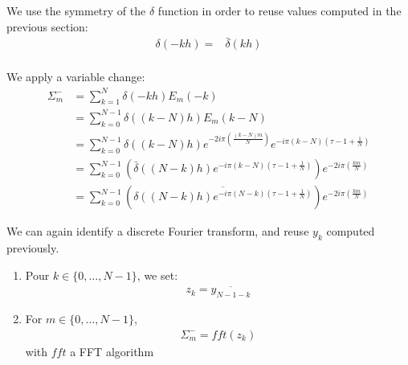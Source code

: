 We use the symmetry of the $\delta$ function in order to reuse values computed in the previous section:
\begin{align*}
\delta(-kh)=&\bar{\delta}(kh)\\
\end{align*}

We apply a variable change:
\begin{align*}
\Sigma_{m}^{-}&=\sum_{k=1}^{N}\delta(-kh)E_{m}(-k)\\
  &=\sum_{k=0}^{N-1}\delta((k-N)h)E_{m}(k-N)\\
  &=\sum_{k=0}^{N-1}\delta((k-N)h) e^{-2i\pi\left(\frac{(k-N) m}{N}\right)}e^{-i\pi (k-N)\left(\tau-1+\frac{1}{N}\right)}\\
  &=\sum_{k=0}^{N-1}\left(\bar{\delta}((N-k)h) e^{-i\pi (k-N)\left(\tau-1+\frac{1}{N}\right)}\right) e^{-2i\pi\left(\frac{k m}{N}\right)} \\
  &=\sum_{k=0}^{N-1}\left(\overline{\delta((N-k)h) e^{-i\pi (N-k)\left(\tau-1+\frac{1}{N}\right)}}\right) e^{-2i\pi\left(\frac{k m}{N}\right)} 
\end{align*}

We can again identify a discrete Fourier transform, and reuse $y_k$ computed previously.
\begin{enumerate}
\item Pour $k\in\{0,\hdots,N-1\}$, we set:
\begin{align}
z_{k}= \overline{y_{N-1-k}}
\end{align}
\item For $m \in\{0,\hdots,N-1\}$,
\begin{align}
  \Sigma_{m}^{-}=fft(z_{k})
\end{align}
with $fft$ a FFT algorithm
\end{enumerate}

